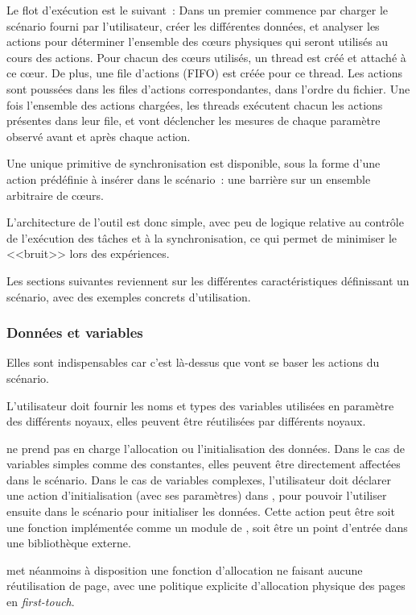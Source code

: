 Le flot d'exécution est le suivant~:
Dans un premier \outil commence par charger le scénario fourni par l'utilisateur, créer les différentes données, et analyser les actions pour déterminer l'ensemble des cœurs physiques qui seront utilisés au cours des actions.
Pour chacun des cœurs utilisés, un thread est créé et attaché à ce cœur. De plus, une file d'actions (FIFO) est créée pour ce thread.
Les actions sont poussées dans les files d'actions correspondantes, dans l'ordre du fichier.
Une fois l'ensemble des actions chargées, les threads exécutent chacun les actions présentes dans leur file, et vont déclencher les mesures de chaque paramètre observé avant et après chaque action.

Une unique primitive de synchronisation est disponible, sous la forme d'une action prédéfinie à insérer dans le scénario~: une barrière sur un ensemble arbitraire de cœurs.


L'architecture de l'outil est donc simple, avec peu de logique relative au contrôle de l'exécution des tâches et à la synchronisation, ce qui permet de minimiser le <<bruit>> lors des expériences.

Les sections suivantes reviennent sur les différentes caractéristiques définissant un scénario, avec des exemples concrets d'utilisation.


\subsubsection{Données et variables}

Elles sont indispensables car c'est là-dessus que vont se baser les actions du scénario.

L'utilisateur doit fournir les noms et types des variables utilisées en paramètre des différents noyaux, elles peuvent être réutilisées par différents noyaux.

\outil ne prend pas en charge l'allocation ou l'initialisation des données. Dans le cas de variables simples comme des constantes, elles peuvent être directement affectées dans le scénario. Dans le cas de variables complexes, l'utilisateur doit déclarer une action d'initialisation (avec ses paramètres) dans \outil, pour pouvoir l'utiliser ensuite dans le scénario pour initialiser les données.
Cette action peut être soit une fonction implémentée comme un module de \outil, soit être un point d'entrée dans une bibliothèque externe.

\outil met néanmoins à disposition une fonction d'allocation ne faisant aucune réutilisation de page, avec une politique explicite d'allocation physique des pages en \emph{first-touch}.


